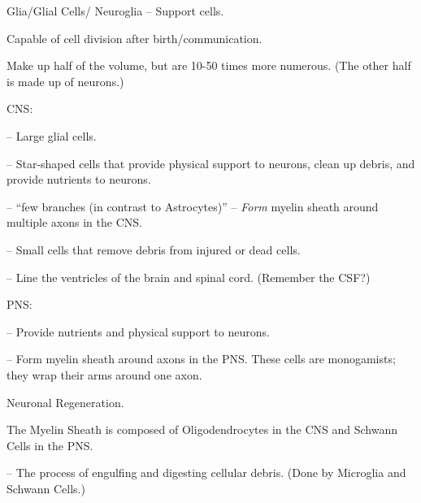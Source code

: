 \begin{coloredlist}
    \item Glia/Glial Cells/ Neuroglia -- Support cells.
    \begin{coloredlist}
        \item Capable of cell division after birth/communication.
        \item Make up half of the volume, but are 10-50 times more numerous. (The other half is made up of neurons.)
        \item CNS:
        \begin{coloredlist}
            \item {} -- Large glial cells.
            \begin{coloredlist}
                \item {} -- Star-shaped cells that provide physical support to neurons, clean up debris, and provide nutrients to neurons.
                \item {} -- ``few branches (in contrast to Astrocytes)'' -- \textit{Form} myelin sheath around multiple axons in the CNS.
            \end{coloredlist}
            \item {} -- Small cells that remove debris from injured or dead cells.
            \item {} -- Line the ventricles of the brain and spinal cord. (Remember the CSF?)
        \end{coloredlist}
        \item PNS:
        \begin{coloredlist}
            \item {} -- Provide nutrients and physical support to neurons.
            \item {} -- Form myelin sheath around axons in the PNS. These cells are monogamists; they wrap their arms around one axon.
            \begin{coloredlist}
                \item Neuronal Regeneration. 
            \end{coloredlist}
        \end{coloredlist}
        \item The Myelin Sheath is composed of Oligodendrocytes in the CNS and Schwann Cells in the PNS.
        \item {} -- The process of engulfing and digesting cellular debris. (Done by Microglia and Schwann Cells.)
    \end{coloredlist}
\end{coloredlist}
